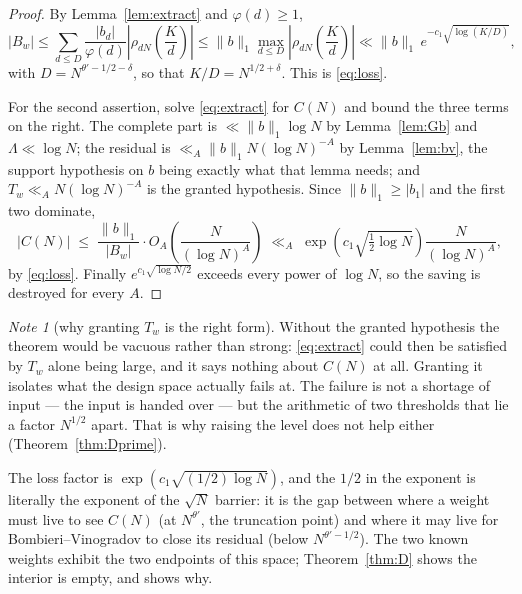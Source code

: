 \documentclass[11pt,a4paper]{article}
\theoremstyle{plain}
\theoremstyle{definition}
\theoremstyle{remark}
\newtheorem{note}[theorem]{Note}
\begin{document}
\begin{proof}
By Lemma~\ref{lem:extract} and $\varphi(d)\ge1$,
\[
  |B_w|\le\sum_{d\le D}\frac{|b_d|}{\varphi(d)}
    \left|\rho_{dN}\!\left(\frac Kd\right)\right|
  \le\|b\|_1\max_{d\le D}\left|\rho_{dN}\!\left(\frac Kd\right)\right|
  \ll\|b\|_1\,e^{-c_1\sqrt{\log(K/D)}},
\]
with $D=N^{\theta'-1/2-\delta}$, so that $K/D=N^{1/2+\delta}$. This is
\eqref{eq:loss}.

For the second assertion, solve \eqref{eq:extract} for $C(N)$ and bound
the three terms on the right. The complete part is
$\ll\|b\|_1\log N$ by Lemma~\ref{lem:Gb} and $\Lambda\ll\log N$; the
residual is $\ll_A\|b\|_1N(\log N)^{-A}$ by Lemma~\ref{lem:bv}, the
support hypothesis on $b$ being exactly what that lemma needs; and
$T_w\ll_AN(\log N)^{-A}$ is the granted hypothesis. Since
$\|b\|_1\ge|b_1|$ and the first two dominate,
\[
  |C(N)|\;\le\;\frac{\|b\|_1}{|B_w|}
     \cdot O_A\!\left(\frac{N}{(\log N)^{A}}\right)
  \;\ll_A\;\exp\!\left(c_1\sqrt{\tfrac12\log N}\right)
     \frac{N}{(\log N)^{A}},
\]
by \eqref{eq:loss}. Finally $e^{c_1\sqrt{\log N/2}}$ exceeds every
power of $\log N$, so the saving is destroyed for every $A$.
\end{proof}

\begin{note}[why granting $T_w$ is the right form]\label{note:granting}
Without the granted hypothesis the theorem would be vacuous rather than
strong: \eqref{eq:extract} could then be satisfied by $T_w$ alone being
large, and it says nothing about $C(N)$ at all. Granting it isolates
what the design space actually fails at. The failure is not a shortage
of input --- the input is handed over --- but the arithmetic of two
thresholds that lie a factor $N^{1/2}$ apart. That is why raising the
level does not help either (Theorem~\ref{thm:Dprime}).
\end{note}

The loss factor is $\exp(c_1\sqrt{(1/2)\log N})$, and the $1/2$ in the
exponent is literally the exponent of the $\sqrt N$ barrier: it is the
gap between where a weight must live to see $C(N)$ (at $N^{\theta'}$,
the truncation point) and where it may live for
Bombieri--Vinogradov to close its residual (below $N^{\theta'-1/2}$).
The two known weights exhibit the two endpoints of this space;
Theorem~\ref{thm:D} shows the interior is empty, and shows why.
\end{document}
